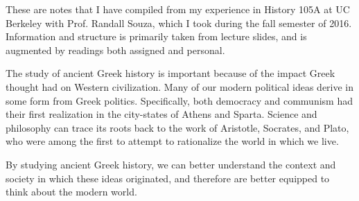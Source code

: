 These are notes that I have compiled from my experience in History 105A at UC Berkeley with Prof. Randall Souza, which I took during the fall semester of 2016. Information and structure is primarily taken from lecture slides, and is augmented by readings both assigned and personal.

The study of ancient Greek history is important because of the impact Greek thought had on Western civilization. Many of our modern political ideas derive in some form from Greek politics. Specifically, both democracy and communism had their first realization in the city-states of Athens and Sparta. Science and philosophy can trace its roots back to the work of Aristotle, Socrates, and Plato, who were among the first to attempt to rationalize the world in which we live. 

By studying ancient Greek history, we can better understand the context and society in which these ideas originated, and therefore are better equipped to think about the modern world.
